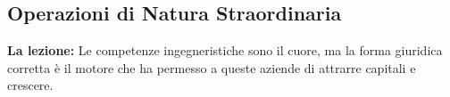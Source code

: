 \documentclass[a4paper,12pt]{article}
\begin{document}

	
	\subsection{Operazioni di Natura Straordinaria}
	
	\textbf{La lezione:} Le competenze ingegneristiche sono il cuore, ma la forma giuridica corretta è il motore che ha permesso a queste aziende di attrarre capitali e crescere.
	
\end{document}
